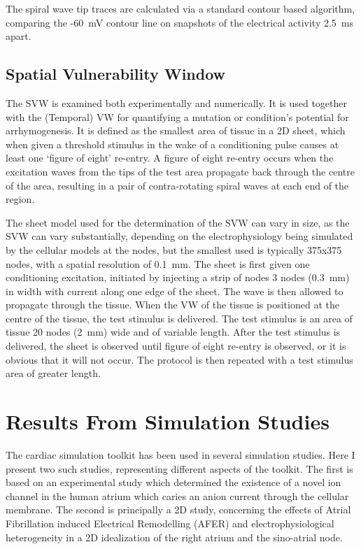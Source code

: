 The spiral wave tip traces are calculated via a standard contour based
algorithm, comparing the -60~mV contour line on snapshots of the electrical
activity 2.5~ms apart.

\subsection{Spatial Vulnerability Window}

The SVW is examined both experimentally and numerically.  It is used together
with the (Temporal) VW for quantifying a mutation or condition's potential for
arrhymogenesis.  It is defined as the smallest area of tissue in a 2D sheet,
which when given a threshold stimulus in the wake of a conditioning pulse causes
at least one `figure of eight' re-entry.  A figure of eight re-entry occurs when
the excitation waves from the tips of the test area propagate back through the
centre of the area, resulting in a pair of contra-rotating spiral waves at each
end of the region.

The sheet model used for the determination of the SVW can vary in size, as the
SVW can vary substantially, depending on the electrophysiology being simulated
by the cellular models at the nodes, but the smallest used is typically 375x375
nodes, with a spatial resolution of 0.1~mm.  The sheet is first given one
conditioning excitation, initiated by injecting a strip of nodes 3 nodes
(0.3~mm) in width with current along one edge of the sheet.  The wave is then
allowed to propagate through the tissue.  When the VW of the tissue is
positioned at the centre of the tissue, the test stimulus is delivered.  The
test stimulus is an area of tissue 20 nodes (2~mm) wide and of variable length.
After the test stimulus is delivered, the sheet is observed until figure of
eight re-entry is observed, or it is obvious that it will not occur.  The
protocol is then repeated with a test stimulus area of greater length.


\section{Results From Simulation Studies}

The cardiac simulation toolkit has been used in several simulation studies.
Here I present two such studies, representing different aspects of the toolkit.
The first is based on an experimental study which determined the existence of a
novel ion channel in the human atrium which caries an anion current through the
cellular membrane.  The second is principally a 2D study, concerning the effects
of Atrial Fibrillation induced Electrical Remodelling (AFER) and
electrophysiological heterogeneity in a 2D idealization of the right atrium and
the sino-atrial node.

